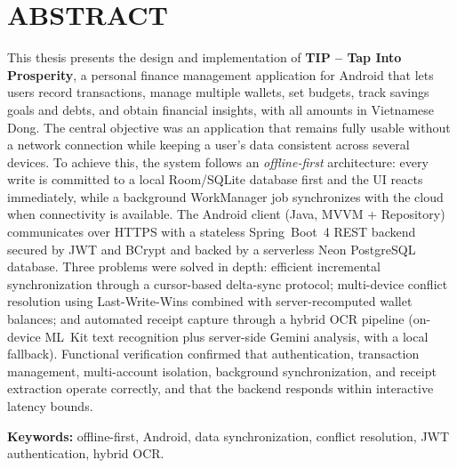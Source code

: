 \documentclass[13pt,a4paper]{extarticle}
\begin{document}
\listoftables
\clearpage

\listoffigures
\clearpage

\section*{ABSTRACT}
\vspace{0.4cm}

This thesis presents the design and implementation of \textbf{TIP -- Tap Into Prosperity}, a
personal finance management application for Android that lets users record transactions, manage
multiple wallets, set budgets, track savings goals and debts, and obtain financial insights, with
all amounts in Vietnamese Dong. The central objective was an application that remains fully usable
without a network connection while keeping a user's data consistent across several devices. To
achieve this, the system follows an \textit{offline-first} architecture: every write is committed
to a local Room/SQLite database first and the UI reacts immediately, while a background WorkManager
job synchronizes with the cloud when connectivity is available. The Android client (Java, MVVM +
Repository) communicates over HTTPS with a stateless Spring~Boot~4 REST backend secured by JWT and
BCrypt and backed by a serverless Neon PostgreSQL database. Three problems were solved in depth:
efficient incremental synchronization through a cursor-based delta-sync protocol; multi-device
conflict resolution using Last-Write-Wins combined with server-recomputed wallet balances; and
automated receipt capture through a hybrid OCR pipeline (on-device ML~Kit text recognition plus
server-side Gemini analysis, with a local fallback). Functional verification confirmed that
authentication, transaction management, multi-account isolation, background synchronization, and
receipt extraction operate correctly, and that the backend responds within interactive latency
bounds.

\vspace{0.4cm}
\noindent\textbf{Keywords:} offline-first, Android, data synchronization, conflict resolution,
JWT authentication, hybrid OCR.
\clearpage

\end{document}

